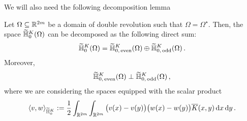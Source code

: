 We will also need the following decomposition lemma
\begin{lemma}
	\label{Lemma:DecompositionHK}
	Let $\Omega \subseteq \mathbb{R}^{2m}$ be a domain of double revolution such that $\Omega = \Omega^\star$. Then, the space $\widetilde{\mathbb{H}}^K_0(\Omega)$ can be decomposed as the following direct sum:
$$
\widetilde{\mathbb{H}}^K_0(\Omega) = \widetilde{\mathbb{H}}^K_{0,\, \mathrm{even}}(\Omega) \oplus \widetilde{\mathbb{H}}^K_{0,\,\mathrm{odd}}(\Omega) \,.
$$
Moreover,
$$
\widetilde{\mathbb{H}}^K_{0,\, \mathrm{even}}(\Omega) \perp \widetilde{\mathbb{H}}^K_{0,\,\mathrm{odd}}(\Omega)\,,
$$
where we are considering the spaces equipped with the scalar product
$$
\langle v,w \rangle_{\widetilde{\mathbb{H}}^K_0} := \dfrac{1}{2}\int_{\mathbb{R}^{2m}} \int_{\mathbb{R}^{2m}}  \big(v(x) - v(y)\big)\big(w(x) - w(y)\big) \overline{K} (x,y) \,\mathrm{d} x \,\mathrm{d} y\,.
$$
\end{lemma}


